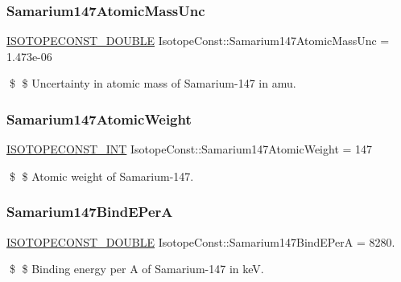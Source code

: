 \subsubsection{\texorpdfstring{Samarium147\+Atomic\+Mass\+Unc}{Samarium147AtomicMassUnc}}
{\footnotesize\ttfamily \mbox{\hyperlink{group___isotope_const-_macros_ga8f45a7272ce02c0b4c65c44636ed719a}{I\+S\+O\+T\+O\+P\+E\+C\+O\+N\+S\+T\+\_\+\+D\+O\+U\+B\+LE}} Isotope\+Const\+::\+Samarium147\+Atomic\+Mass\+Unc = 1.\+473e-\/06}

\$ \$ Uncertainty in atomic mass of Samarium-\/147 in amu. \mbox{\label{group___isotope_const-_samarium-_sm147_ga48e2a18c62aae601ae431b920f522fd8}} 
\subsubsection{\texorpdfstring{Samarium147\+Atomic\+Weight}{Samarium147AtomicWeight}}
{\footnotesize\ttfamily \mbox{\hyperlink{group___isotope_const-_macros_ga5f18360b3e99483a35c32d789e62621c}{I\+S\+O\+T\+O\+P\+E\+C\+O\+N\+S\+T\+\_\+\+I\+NT}} Isotope\+Const\+::\+Samarium147\+Atomic\+Weight = 147}

\$ \$ Atomic weight of Samarium-\/147. \mbox{\label{group___isotope_const-_samarium-_sm147_ga185b07e72df0a849da297524a9d4016a}} 
\subsubsection{\texorpdfstring{Samarium147\+Bind\+E\+PerA}{Samarium147BindEPerA}}
{\footnotesize\ttfamily \mbox{\hyperlink{group___isotope_const-_macros_ga8f45a7272ce02c0b4c65c44636ed719a}{I\+S\+O\+T\+O\+P\+E\+C\+O\+N\+S\+T\+\_\+\+D\+O\+U\+B\+LE}} Isotope\+Const\+::\+Samarium147\+Bind\+E\+PerA = 8280.}

\$ \$ Binding energy per A of Samarium-\/147 in keV. \mbox{\label{group___isotope_const-_samarium-_sm147_ga2b580c612fc81805ffc65fa0b0326c62}} 
